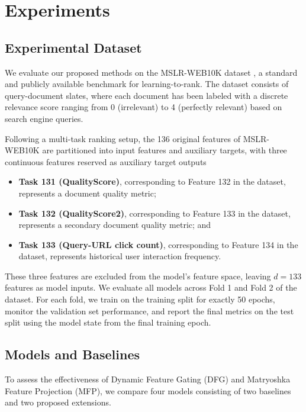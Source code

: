 \section{Experiments}

\subsection{Experimental Dataset}

We evaluate our proposed methods on the MSLR-WEB10K dataset \cite{QinL13}, a standard and publicly available benchmark for learning-to-rank. The dataset consists of query-document slates, where each document has been labeled with a discrete relevance score ranging from 0 (irrelevant) to 4 (perfectly relevant) based on search engine queries.

Following a multi-task ranking setup, the 136 original features of MSLR-WEB10K are partitioned into input features and auxiliary targets, with three continuous features reserved as auxiliary target outputs
\begin{itemize}
    \item \textbf{Task 131 (QualityScore)}, corresponding to Feature 132 in the dataset, represents a document quality metric;
    \item \textbf{Task 132 (QualityScore2)}, corresponding to Feature 133 in the dataset, represents a secondary document quality metric; and
    \item \textbf{Task 133 (Query-URL click count)}, corresponding to Feature 134 in the dataset, represents historical user interaction frequency.
\end{itemize}
These three features are excluded from the model's feature space, leaving $d = 133$ features as model inputs. We evaluate all models across Fold 1 and Fold 2 of the dataset. For each fold, we train on the training split for exactly 50 epochs, monitor the validation set performance, and report the final metrics on the test split using the model state from the final training epoch.

\subsection{Models and Baselines}
To assess the effectiveness of Dynamic Feature Gating (DFG) and Matryoshka Feature Projection (MFP), we compare four models consisting of two baselines and two proposed extensions.

